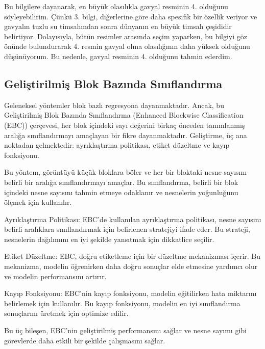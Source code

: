 \documentclass[10pt,a4paper]{report}
\begin{document}
\begin{justify}
\begin{landscape}
\begin{figure}[!h]
		\end{figure}
		
	\end{landscape}
	
	
		Bu bilgilere dayanarak, en büyük olasılıkla gavyal resminin 4. olduğunu söyleyebilirim. Çünkü 3. bilgi, diğerlerine göre daha spesifik bir özellik veriyor ve gavyalın  tuzlu su timsahından sonra dünyanın en büyük timsah çeşididir belirtiyor. Dolayısıyla, bütün  resimler arasında seçim yaparken, bu bilgiyi göz önünde bulundurarak 4. resmin gavyal olma olasılığının daha yüksek olduğunu düşünüyorum. Bu nedenle, gavyal resminin 4. olduğunu tahmin ederdim.
	
	
	\subsection{Geliştirilmiş Blok Bazında Sınıflandırma}
	
		Geleneksel yöntemler blok bazlı regresyona dayanmaktadır. Ancak, bu Geliştirilmiş Blok Bazında Sınıflandırma (Enhanced Blockwise Classification (EBC)) çerçevesi, her blok içindeki sayı değerini birkaç önceden tanımlanmış aralığa sınıflandırmayı amaçlayan bir fikre dayanmaktadır. Geliştirme, üç ana noktadan gelmektedir: ayrıklaştırma politikası, etiket düzeltme ve kayıp fonksiyonu\cite{idrees2018composition}.
	\newline  
	
	
	Bu yöntem, görüntüyü küçük bloklara böler ve her bir bloktaki nesne sayısını belirli bir aralığa sınıflandırmayı amaçlar. Bu sınıflandırma, belirli bir blok içindeki nesne sayısını tahmin etmeye odaklanır ve nesnelerin yoğunluğunu ölçmek için kullanılır.
	\newline   
	
	
	Ayrıklaştırma Politikası: EBC'de kullanılan ayrıklaştırma politikası, nesne sayısını belirli aralıklara sınıflandırmak için belirlenen stratejiyi ifade eder. Bu strateji, nesnelerin dağılımını en iyi şekilde yansıtmak için dikkatlice seçilir.
	
	Etiket Düzeltme: EBC, doğru etiketleme için bir düzeltme mekanizması içerir. Bu mekanizma, modelin öğrenirken daha doğru sonuçlar elde etmesine yardımcı olur ve modelin performansını artırır.
	
	Kayıp Fonksiyonu: EBC'nin kayıp fonksiyonu, modelin eğitilirken hata miktarını belirlemek için kullanılır. Bu kayıp fonksiyonu, modelin en iyi sınıflandırma sonuçlarını üretmek için optimize edilir.
	
	Bu üç bileşen, EBC'nin geliştirilmiş performansını sağlar ve nesne sayımı gibi görevlerde daha etkili bir şekilde çalışmasını sağlar.
	

\end{justify}
\end{document}
